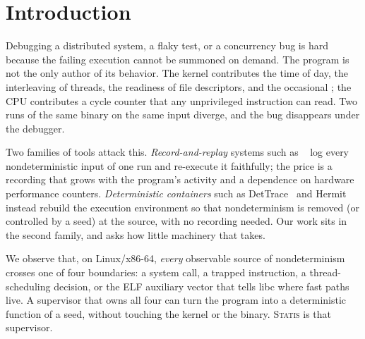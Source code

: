 \documentclass[10pt,twocolumn]{article}
\newcommand{\statis}{\textsc{Statis}}
\newcommand{\sys}[1]{\texttt{\detokenize{#1}}}
\begin{document}
\section{Introduction}
Debugging a distributed system, a flaky test, or a concurrency bug is hard because the failing execution cannot be summoned on demand. The program is not the only author of its behavior. The kernel contributes the time of day, the interleaving of threads, the readiness of file descriptors, and the occasional \sys{ECONNRESET}; the CPU contributes a cycle counter that any unprivileged instruction can read. Two runs of the same binary on the same input diverge, and the bug disappears under the debugger.

Two families of tools attack this. \emph{Record-and-replay} systems such as \sys{rr}~\cite{rr} log every nondeterministic input of one run and re-execute it faithfully; the price is a recording that grows with the program's activity and a dependence on hardware performance counters. \emph{Deterministic containers} such as DetTrace~\cite{dettrace} and Hermit~\cite{hermit} instead rebuild the execution environment so that nondeterminism is removed (or controlled by a seed) at the source, with no recording needed. Our work sits in the second family, and asks how little machinery that takes.

We observe that, on Linux/x86-64, \emph{every} observable source of nondeterminism crosses one of four boundaries: a system call, a trapped instruction, a thread-scheduling decision, or the ELF auxiliary vector that tells libc where fast paths live. A supervisor that owns all four can turn the program into a deterministic function of a seed, without touching the kernel or the binary. \statis{} is that supervisor.
\end{document}
